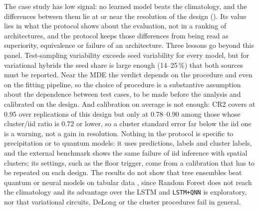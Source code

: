 \documentclass[11pt,a4paper]{article}
\begin{document}
The case study has low signal: no learned model beats the climatology, and the differences between them lie at or near the resolution of the design (). Its value lies in what the protocol shows about the evaluation, not in a ranking of architectures, and the protocol keeps those differences from being read as superiority, equivalence or failure of an architecture. Three lessons go beyond this panel. Test-sampling variability exceeds seed variability for every model, but for variational hybrids the seed share is large enough (14--25\,\%) that both sources must be reported. Near the MDE the verdict depends on the procedure and even on the fitting pipeline, so the choice of procedure is a substantive assumption about the dependence between test cases, to be made before the analysis and calibrated on the design. And calibration on average is not enough: CR2 covers at 0.95 over replications of this design but only at 0.78--0.90 among those whose cluster/iid ratio is 0.72 or lower, so a cluster standard error far below the iid one is a warning, not a gain in resolution. Nothing in the protocol is specific to precipitation or to quantum models: it uses predictions, labels and cluster labels, and the external benchmark shows the same failure of iid inference with spatial clusters; its settings, such as the floor trigger, come from a calibration that has to be repeated on each design. The results do not show that tree ensembles beat quantum or neural models on tabular data \citep{grinsztajn2022}, since Random Forest does not reach the climatology and its advantage over the LSTM and \texttt{LSTM+QNN} is exploratory, nor that variational circuits, DeLong or the cluster procedures fail in general.
\end{document}
